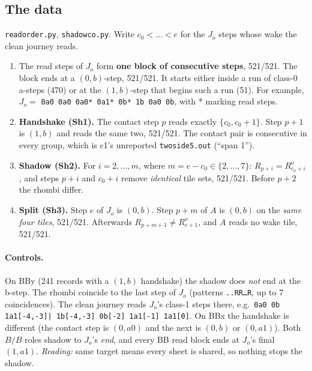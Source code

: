 \documentclass[11pt]{article}
\theoremstyle{definition}\newtheorem{definition}[theorem]{Definition}\newtheorem{remark}[theorem]{Remark}
\begin{document}
\subsection{The data}
\texttt{readorder.py}, \texttt{shadowco.py}. Write $c_0<\dots<e$ for the $J_o$ steps whose wake the clean journey reads.
\begin{enumerate}
\item The read steps of $J_o$ form \textbf{one block of consecutive steps}, 521/521. The block ends at a $(0,b)$-step, 521/521. It starts either inside a run of class-0 a-steps (470) or at the $(1,b)$-step that begins such a run (51). For example, $J_o=$ \texttt{0a0 0a0 0a0* 0a1* 0b* 1b 0a0 0b}, with * marking read steps.
\item \textbf{Handshake (Sh1).} The contact step $p$ reads exactly $\{c_0,c_0+1\}$. Step $p+1$ is $(1,b)$ and reads the same two, 521/521. The contact pair is consecutive in every group, which is c1's unreported \texttt{twoside5.out} (``span 1'').
\item \textbf{Shadow (Sh2).} For $i=2,\dots,m$, where $m=e-c_0\in\{2,\dots,7\}$: $R_{p+i}=R^o_{c_0+i}$, and steps $p+i$ and $c_0+i$ remove \emph{identical} tile sets, 521/521. Before $p+2$ the rhombi differ.
\item \textbf{Split (Sh3).} Step $e$ of $J_o$ is $(0,b)$. Step $p+m$ of $A$ is $(0,b)$ on the \emph{same four tiles}, 521/521. Afterwards $R_{p+m+1}\ne R^o_{e+1}$, and $A$ reads no wake tile, 521/521.
\end{enumerate}
\paragraph{Controls.} On BBy (241 records with a $(1,b)$ handshake) the shadow does \emph{not} end at the b-step. The rhombi coincide to the last step of $J_o$ (patterns \texttt{..RR\dots R}, up to 7 coincidences). The clean journey reads $J_o$'s class-1 steps there, e.g.\ \texttt{0a0 0b 1a1[-4,-3]| 1b[-4,-3] 0b[-2] 1a1[-1] 1a1[0]}. On BBx the handshake is different (the contact step is $(0,a0)$ and the next is $(0,b)$ or $(0,a1)$). Both $B/B$ roles shadow to $J_o$'s \emph{end}, and every BB read block ends at $J_o$'s final $(1,a1)$.
\emph{Reading:} same target means every sheet is shared, so nothing stops the shadow.
\end{document}
